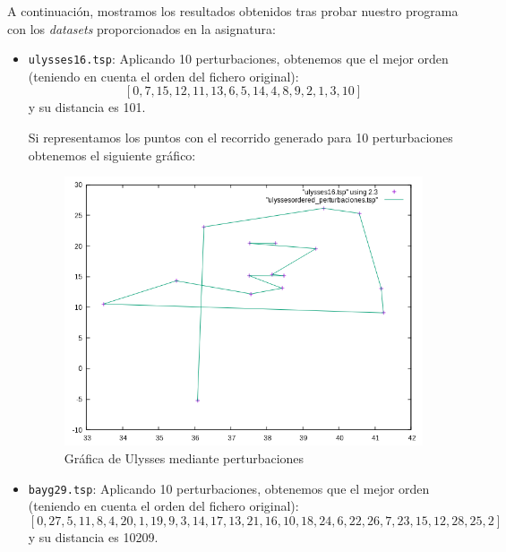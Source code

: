 \documentclass[10pt,a4paper]{article}
\begin{document}
A continuación, mostramos los resultados obtenidos tras probar nuestro programa con los \textit{datasets} proporcionados en la asignatura:
\begin{itemize}
	\item \texttt{ulysses16.tsp}: Aplicando 10 perturbaciones, obtenemos que el mejor orden (teniendo en cuenta el orden del fichero original):
	\[
		[0,7,15,12,11,13,6,5,14,4,8,9,2,1,3,10]
	\]
	y su distancia es 101.

	Si representamos los puntos con el recorrido generado para 10 perturbaciones obtenemos el siguiente gráfico:
	\begin{figure}[h!]
	\centering
	\includegraphics[scale=0.5]{./Images/ulysses_perturbaciones.png}
	\caption{Gráfica de Ulysses mediante perturbaciones}
	\end{figure}
	
	\newpage
	
	\item \texttt{bayg29.tsp}: Aplicando 10 perturbaciones, obtenemos que el mejor orden (teniendo en cuenta el orden del fichero original):
	\[
		[0,27,5,11,8,4,20,1,19,9,3,14,17,13,21,16,10,18,24,6,22,26,7,23,15,12,28,25,2]
	\]
	y su distancia es 10209.


\end{itemize}
\end{document}
